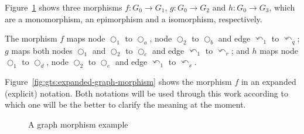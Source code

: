 \begin{example}Figure~\ref{fig:gts:compact-graph-morphism} shows three morphisms $f : G_0 \rightarrow G_1$, $g : G_0 \rightarrow G_2$ and $h : G_0 \rightarrow G_3$, which are a monomorphism, an epimorphism and a isomorphism, respectively.

  The morphism $f$ maps node $\Circle_1$ to $\Circle_a$, node $\Circle_2$ to $\Circle_b$ and edge $\curvearrowleft_1$ to $\curvearrowleft_q$; $g$ maps both nodes $\Circle_1$ and $\Circle_2$ to $\Circle_c$ and edge $\curvearrowleft_1$ to $\curvearrowleft_r$; and $h$ maps node $\Circle_1$ to $\Circle_d$, node $\Circle_2$ to $\Circle_e$ and edge $\curvearrowleft_1$ to $\curvearrowleft_s$.

  Figure~\ref{fig:gts:expanded-graph-morphism} shows the morphism $f$ in an expanded (explicit) notation. Both notations will be used through this work according to which one will be the better to clarify the meaning at the moment.
\begin{figure}[!ht]
  \centering
  \caption{A graph morphism example}\label{fig:gts:compact-graph-morphism}
\end{figure}


\end{example}
